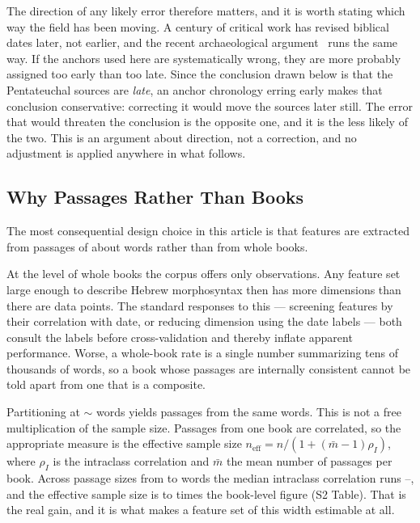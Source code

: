 \documentclass[10pt,letterpaper]{article}
\begin{document}
The direction of any likely error therefore matters, and it is worth stating
which way the field has been moving.  A century of critical work has revised
biblical dates later, not earlier, and the recent archaeological
argument~\cite{Adler2022} runs the same way.  If the anchors used here are
systematically wrong, they are more probably assigned too early than too late.
Since the conclusion drawn below is that the Pentateuchal sources are
\emph{late}, an anchor chronology erring early makes that conclusion
conservative: correcting it would move the sources later still.  The error that
would threaten the conclusion is the opposite one, and it is the less likely of
the two.  This is an argument about direction, not a correction, and no
adjustment is applied anywhere in what follows.





\subsection*{Why Passages Rather Than Books}

The most consequential design choice in this article is that features are
extracted from passages of about \HBtarget{} words rather than from whole books.

At the level of whole books the corpus offers only \HBbooks{} observations.  Any
feature set large enough to describe Hebrew morphosyntax then has more
dimensions than there are data points.  The standard responses to this ---
screening features by their correlation with date, or reducing dimension using
the date labels --- both consult the labels before cross-validation and thereby
inflate apparent performance.  Worse, a whole-book rate is a single number
summarizing tens of thousands of words, so a book whose passages are internally
consistent cannot be told apart from one that is a composite.

Partitioning at $\sim$\HBtarget{} words yields \HBchunks{} passages from the same
\HBwords{} words.  This is not a free multiplication of the sample size.
Passages from one book are correlated, so the appropriate measure is the
effective sample size $n_{\mathrm{eff}} = n / (1 + (\bar{m}-1)\rho_{I})$, where
$\rho_I$ is the intraclass correlation and $\bar m$ the mean number of passages
per book.  Across passage sizes from \ICCszLo{} to \ICCszHi{} words the median
intraclass correlation runs \ICClo--\ICChi, and the effective sample size is
\ICCgainLo{} to \ICCgainHi{} times the book-level figure (S2 Table).  That is the real gain, and it is what
makes a feature set of this width estimable at all.
\end{document}

